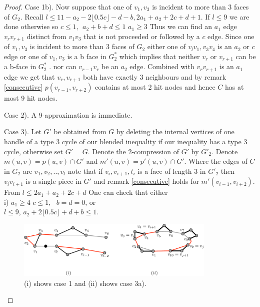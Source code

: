 \documentclass{article}
\newcommand{\0}{\mathbb{0}}
\newcommand{\1}{\mathbb{1}}
\begin{document}
\begin{proof}
 Case 1b). Now suppose that one of $v_1, v_3$ is incident to more than 3 faces of $G_2$. Recall  $ l \leq 11- a_2 -2 \lfloor 0.5 c \rfloor -d  -b , 2a_1+a_2+2c+d +1  $.  If $l \leq 9$ we are done otherwise so $c \leq 1, \ \ a_2+b+d \leq 1$  $ a_1 \geq 3 $
Thus we can find an $a_1$ edge $ v_r v_{r+1}$  distinct from $v_1 v_3$ that is not proceeded or followed by a $c$ edge. Since  one of $v_1, v_3$ is incident to more than 3 faces of $G_2$ either one of $ v_l v_1 , v_3 v_4$ is an $a_2$ or $ c $ edge or one of $ v_1, v_3$ is a b face in $G_2^*$ which implies that neither $v_r   $ or $v_{r+1}$ can be a b-face  in $G_2^*$ . nor can $v_{r-1} v_r$ be an $a_2$ edge. Combined with $ v_r v_{r+1}$ is an $a_1$ edge we get that $v_r,v_{r+1}$ both have exactly 3 neighbours and by remark \ref{consecutive}  $p(v_{r-1}, v_{r+2} )$ contains at most 2 hit nodes and hence $C$ has at most 9 hit nodes. 

Case 2).  A 9-approximation is immediate. 

Case 3). %
Let $G'$ be obtained from $G$ by deleting the internal vertices of one handle of a type 3 cycle of our blended inequality if our inequality has a type 3 cycle, otherwise set $G'=G$. Denote the 2-compression of $G'$ by $G'_2$.
Denote $m(u,v) =p(u,v) \cap G'$ and $m'(u,v)=p'(u,v) \cap G'$.   Where the edges of $C$ in $G_2$ are $v_1,v_2,..,v_l$ note that if $v_i,v_{i+1} , t_i$ is a face of length 3 in $ G'_2$ then $ v_i v_{i+1}$ is a single piece in $G'$ and remark \ref{consecutive} holds for $m'(v_{i-1},v_{i+2})$. From $l \leq 2a_1 + a_2 + 2c +d $
One can check that either \\
i) $a_1 \geq 4 $   $ c \leq 1, \ \ \ b=d=0 $, or \\ $ l \leq 9 $,   $a_2+ 2 \lfloor 0.5c \rfloor +d +b  \leq 1 $.

\begin{figure}[h]
\begin{center}
    \includegraphics[width=0.85\textwidth]{evenCase1AndCase3a).pdf}
    \caption{\label{Case1nCase3a} (i) shows case 1 and (ii) shows case 3a). }
\end{center}


\end{figure}
\end{proof}
\end{document}
